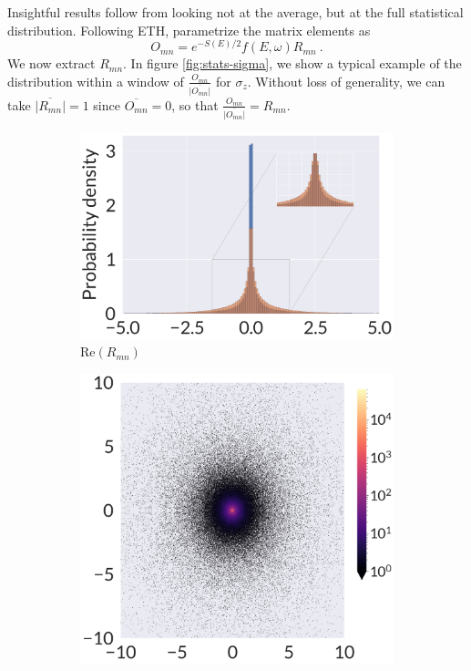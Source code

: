Insightful results follow from looking not at the average, but at the full statistical distribution. Following ETH, parametrize the matrix elements as
\begin{equation}
O_{mn}=e^{-S(E)/2} f(E,\omega) R_{mn}~.
\end{equation}
We now extract $R_{mn}$. In figure \ref{fig:stats-sigma}, we show a typical example of the distribution within a window of $\frac{O_{mn}}{\overline{|O_{mn}|}}$ for $\sigma_z$. Without loss of generality, we can take $\overline{|R_{mn}|}=1$ since $\overline{O_{mn}}=0$, so that $\frac{O_{mn}}{\overline{|O_{mn}|}}=R_{mn}$. 

\begin{figure}
	\centering
\begin{subfigure}[b]{0.45\textwidth}
	\centering
\includegraphics[width=\columnwidth]{figures/chapter1/sigmaz-dist-hist.png}
\caption{$\text{Re}(R_{mn})$}
\end{subfigure}%
\begin{subfigure}[b]{0.22\textwidth}
	\centering
\includegraphics[width=\columnwidth]{figures/chapter1/sigmaz0-2ddist-hist.png}

\end{subfigure}
\end{figure}
